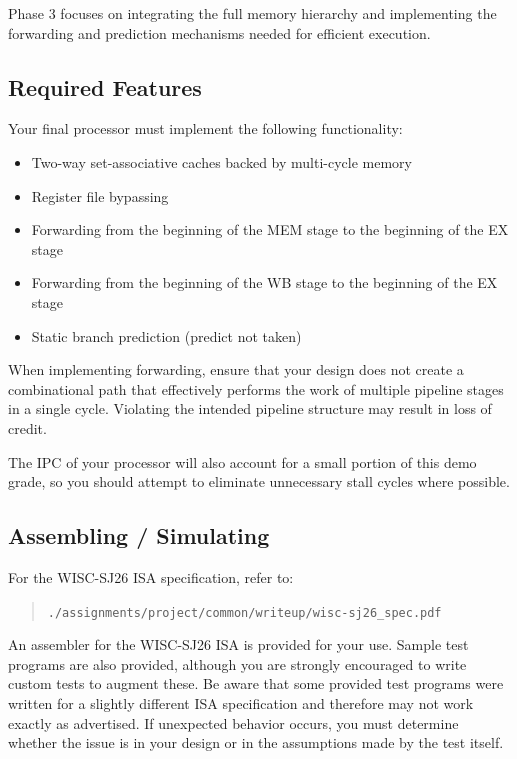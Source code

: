 \documentclass[12pt]{article}
\begin{document}
Phase 3 focuses on integrating the full memory hierarchy and implementing the
forwarding and prediction mechanisms needed for efficient execution.

\subsection*{Required Features}

Your final processor must implement the following functionality:

\begin{itemize}
\item Two-way set-associative caches backed by multi-cycle memory
\item Register file bypassing
\item Forwarding from the beginning of the MEM stage to the beginning of the EX stage
\item Forwarding from the beginning of the WB stage to the beginning of the EX stage
\item Static branch prediction (predict not taken)
\end{itemize}

When implementing forwarding, ensure that your design does not create a combinational
path that effectively performs the work of multiple pipeline stages in a single cycle.
Violating the intended pipeline structure may result in loss of credit.

The IPC of your processor will also account for a small portion of this demo grade, so you
should attempt to eliminate unnecessary stall cycles where possible.

\subsection*{Assembling / Simulating}

For the WISC-SJ26 ISA specification, refer to:

\begin{quote}
\texttt{./assignments/project/common/writeup/wisc-sj26\_spec.pdf}
\end{quote}

An assembler for the WISC-SJ26 ISA is provided for your use. Sample test
programs are also provided, although you are strongly encouraged to write custom
tests to augment these. Be aware that some provided test programs were written
for a slightly different ISA specification and therefore may not work exactly as
advertised. If unexpected behavior occurs, you must determine whether the issue
is in your design or in the assumptions made by the test itself.
\end{document}
